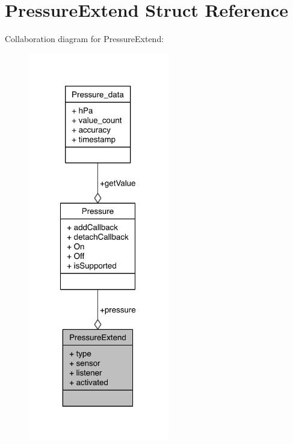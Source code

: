 \section{Pressure\-Extend Struct Reference}
\label{structPressureExtend}


Collaboration diagram for Pressure\-Extend\-:
\nopagebreak
\begin{figure}[H]
\begin{center}
\leavevmode
\includegraphics[width=174pt]{structPressureExtend__coll__graph}
\end{center}
\end{figure}
